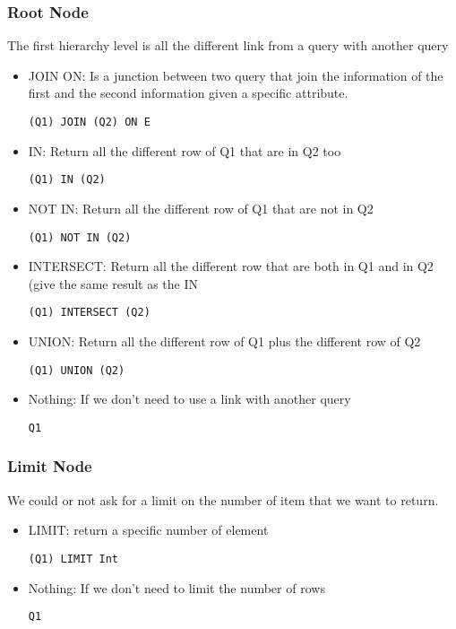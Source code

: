 \documentclass{article}
\begin{document}
\subsubsection{Root Node}
The first hierarchy level is all the different link from a query with another query
\begin{itemize}
\item JOIN ON: Is a junction between two query that join the information of the first and the second information given a specific attribute.
\begin{verbatim}
(Q1) JOIN (Q2) ON E
\end{verbatim}
\item IN: Return all the different row of Q1 that are in Q2 too
\begin{verbatim}
(Q1) IN (Q2)
\end{verbatim}
\item NOT IN: Return all the different row of Q1 that are not in Q2
\begin{verbatim}
(Q1) NOT IN (Q2)
\end{verbatim}
\item INTERSECT: Return all the different row that are both in Q1 and in Q2 (give the same result as the IN 
\begin{verbatim}
(Q1) INTERSECT (Q2)
\end{verbatim}
\item UNION: Return all the different row of Q1 plus the different row of Q2
\begin{verbatim}
(Q1) UNION (Q2)
\end{verbatim}
\item Nothing: If we don't need to use a link with another query
\begin{verbatim}
Q1
\end{verbatim}
\end{itemize}
\subsubsection{Limit Node}
We could or not ask for a limit on the number of item that we want to return.
\begin{itemize}
\item LIMIT: return a specific number of element
\begin{verbatim}
(Q1) LIMIT Int
\end{verbatim}
\item Nothing:  If we don't need to limit the number of rows
\begin{verbatim}
Q1
\end{verbatim}
\end{itemize}
\end{document}
